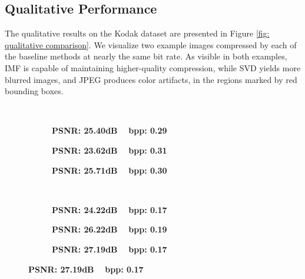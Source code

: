 \subsection{Qualitative Performance}

The qualitative results on the Kodak dataset are presented in Figure \ref{fig: qualitative comparison}. We visualize two example images compressed by each of the baseline methods at nearly the same bit rate. As visible in both examples, IMF is capable of maintaining higher-quality compression, while SVD yields more blurred images, and JPEG produces color artifacts, in the regions marked by red bounding boxes.

\begin{figure}[t]
    \captionsetup[subfigure]{aboveskip=-1pt,belowskip=2pt}
	\centering
	\begin{subfigure}{.25\textwidth}
		\centering
		\caption*{\tiny \ }
	\end{subfigure}%
	\begin{subfigure}{.25\textwidth}
		\centering
        \caption*{\tiny \textbf{PSNR: 25.40dB ~ bpp: 0.29}}
	\end{subfigure}%
	\begin{subfigure}{.25\textwidth}
		\centering
		\caption*{\tiny \textbf{PSNR: 23.62dB ~ bpp: 0.31}}
	\end{subfigure}%
	\begin{subfigure}{.25\textwidth}
		\centering
		\caption*{\tiny \textbf{PSNR: 25.71dB ~ bpp: 0.30}}
	\end{subfigure}

	\begin{subfigure}{.25\textwidth}
		\centering
		\caption*{\tiny \ }
	\end{subfigure}%
	\begin{subfigure}{.25\textwidth}
		\centering
		\caption*{\tiny \textbf{PSNR: 24.22dB ~ bpp: 0.17}}
	\end{subfigure}%
	\begin{subfigure}{.25\textwidth}
		\centering
		\caption*{\tiny \textbf{PSNR: 26.22dB ~ bpp: 0.19}}
	\end{subfigure}%
	\begin{subfigure}{.25\textwidth}
		\centering
		\caption*{\tiny \textbf{PSNR: 27.19dB ~ bpp: 0.17}}
	\end{subfigure}    
	

\end{figure}
